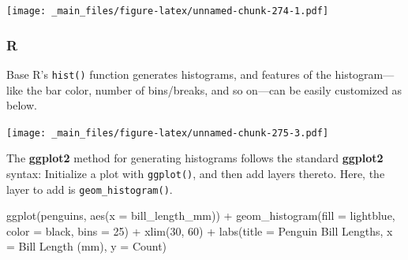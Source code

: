 \documentclass[
]{book}
\newenvironment{Shaded}{\begin{snugshade}}{\end{snugshade}}
\newcommand{\AttributeTok}[1]{\textcolor[rgb]{0.77,0.63,0.00}{#1}}
\newcommand{\DecValTok}[1]{\textcolor[rgb]{0.00,0.00,0.81}{#1}}
\newcommand{\FunctionTok}[1]{\textcolor[rgb]{0.00,0.00,0.00}{#1}}
\newcommand{\NormalTok}[1]{#1}
\newcommand{\SpecialCharTok}[1]{\textcolor[rgb]{0.00,0.00,0.00}{#1}}
\newcommand{\StringTok}[1]{\textcolor[rgb]{0.31,0.60,0.02}{#1}}
\begin{document}
\texttt{[image: \_main\_files/figure-latex/unnamed-chunk-274-1.pdf]}

\hypertarget{r-41}{%
\subsubsection*{R}\label{r-41}}

Base R's \texttt{hist()} function generates histograms, and features of the histogram---like the bar color, number of bins/breaks, and so on---can be easily customized as below.

\begin{Shaded}
\end{Shaded}

\texttt{[image: \_main\_files/figure-latex/unnamed-chunk-275-3.pdf]}

The \textbf{ggplot2} method for generating histograms follows the standard \textbf{ggplot2} syntax: Initialize a plot with \texttt{ggplot()}, and then add layers thereto. Here, the layer to add is \texttt{geom\_histogram()}.

\begin{Shaded}
\begin{Highlighting}[]
\FunctionTok{ggplot}\NormalTok{(penguins, }\FunctionTok{aes}\NormalTok{(}\AttributeTok{x =}\NormalTok{ bill\_length\_mm)) }\SpecialCharTok{+}
  \FunctionTok{geom\_histogram}\NormalTok{(}\AttributeTok{fill =} \StringTok{\textquotesingle{}lightblue\textquotesingle{}}\NormalTok{, }\AttributeTok{color =} \StringTok{\textquotesingle{}black\textquotesingle{}}\NormalTok{, }\AttributeTok{bins =} \DecValTok{25}\NormalTok{) }\SpecialCharTok{+}
  \FunctionTok{xlim}\NormalTok{(}\DecValTok{30}\NormalTok{, }\DecValTok{60}\NormalTok{) }\SpecialCharTok{+} 
  \FunctionTok{labs}\NormalTok{(}\AttributeTok{title =} \StringTok{\textquotesingle{}Penguin Bill Lengths\textquotesingle{}}\NormalTok{, }
       \AttributeTok{x =} \StringTok{\textquotesingle{}Bill Length (mm)\textquotesingle{}}\NormalTok{, }\AttributeTok{y =} \StringTok{\textquotesingle{}Count\textquotesingle{}}\NormalTok{)}
\end{Highlighting}
\end{Shaded}
\end{document}
